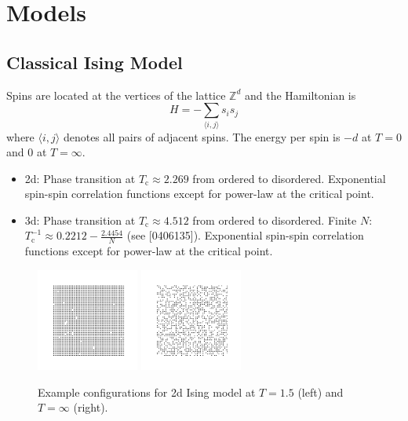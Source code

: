 \documentclass[11pt]{article}
\begin{document}
\section{Models}
\subsection{Classical Ising Model}
Spins are located at the vertices of the lattice $\mathbb{Z}^d$ and the Hamiltonian is
\begin{equation}
    H = -\sum_{\langle i,j\rangle}s_is_j
\end{equation}
where $\langle i,j\rangle$ denotes all pairs of adjacent spins. The energy per spin is $-d$ at $T=0$ and 0 at $T=\infty$.
\begin{itemize}
    \item 2d: Phase transition at $T_\text{c}\approx 2.269$ from ordered to disordered. Exponential spin-spin correlation functions except for power-law at the critical point.
    \item 3d: Phase transition at $T_\text{c}\approx 4.512$ from ordered to disordered. Finite $N$: $T_\text{c}^{-1}\approx 0.2212-\frac{2.4454}{N}$ (see [0406135]). Exponential spin-spin correlation functions except for power-law at the critical point.
\end{itemize}

\begin{figure}[h]
    \centering
    \includegraphics[width=0.3\textwidth]{ising_images/ising_T=150.png}
    \includegraphics[width=0.3\textwidth]{ising_images/ising_T=inf.png}
    \caption{Example configurations for 2d Ising model at $T=1.5$ (left) and $T=\infty$ (right).}
\end{figure}
\end{document}
